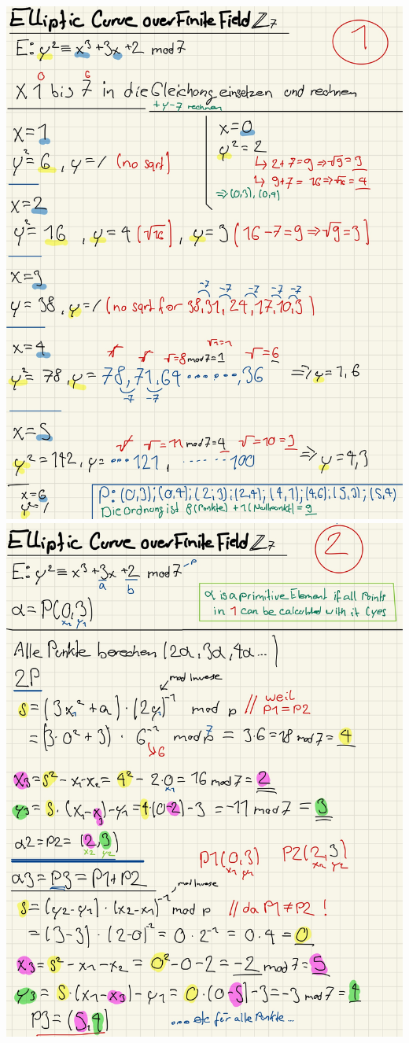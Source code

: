 \documentclass[11pt]{article}
\begin{document}
\begin{center}
	\includegraphics[scale=0.87]{img/ecurve_z_1.jpg}
	\includegraphics[scale=0.87]{img/ecurve_z_2.jpg}
\end{center}
\end{document}

